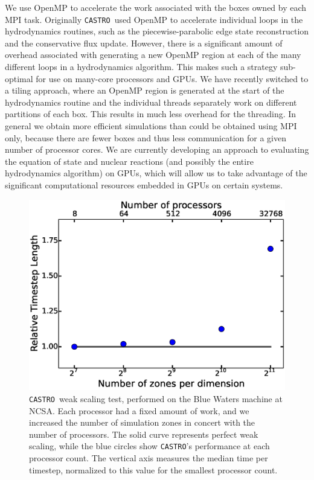 \documentclass[iop]{../emulateapj}
\newcommand{\castro}{\texttt{CASTRO}}
\begin{document}
We use OpenMP to accelerate the work associated with the boxes owned by each 
MPI task. Originally \castro\ used OpenMP to accelerate individual loops in the 
hydrodynamics routines, such as the piecewise-parabolic edge state reconstruction 
and the conservative flux update. However, there is a significant amount of 
overhead associated with generating a new OpenMP region at each of the many 
different loops in a hydrodynamics algorithm. This makes such a strategy 
sub-optimal for use on many-core processors and GPUs. We have recently switched 
to a tiling approach, where an OpenMP region is generated at the start of 
the hydrodynamics routine and the individual threads separately work on 
different partitions of each box. This results in much less overhead for 
the threading. In general we obtain more efficient simulations than 
could be obtained using MPI only, because there are fewer boxes and thus 
less communication for a given number of processor cores. We are currently 
developing an approach to evaluating the equation of state and nuclear reactions 
(and possibly the entire hydrodynamics algorithm) on GPUs, which will allow us
to take advantage of the significant computational resources embedded in GPUs on 
certain systems.

\begin{figure}
  \centering
  \includegraphics[scale=0.4]{plots/weak_scaling}
  \caption{\castro\ weak scaling test, performed on the Blue Waters machine at 
    NCSA. Each processor had a fixed amount of work, and we increased the 
    number of simulation zones in concert with the number of processors. The 
    solid curve represents perfect weak scaling, while the blue circles show 
    \castro's performance at each processor count. The vertical axis measures 
    the median time per timestep, normalized to this value for the smallest 
    processor count.\label{fig:weak_scaling}}
\end{figure}
\end{document}

